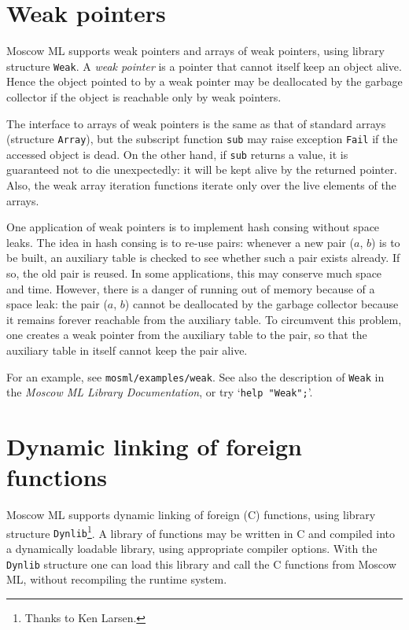 \documentclass[fleqn,a4paper]{article}
\begin{document}
\newpage


\section{Weak pointers}
\label{sec-weak-pointers}

Moscow ML supports weak pointers and arrays of weak pointers, using
library structure {\tt Weak}.  A {\em weak pointer\/} is a pointer
that cannot itself keep an object alive.  Hence the object pointed to
by a weak pointer may be deallocated by the garbage collector if the
object is reachable only by weak pointers.

The interface to arrays of weak pointers is the same as that of
standard arrays (structure {\tt Array}), but the subscript function
{\tt sub} may raise exception {\tt Fail} if the accessed object is
dead.  On the other hand, if {\tt sub} returns a value, it is
guaranteed not to die unexpectedly: it will be kept alive by the
returned pointer.  Also, the weak array iteration functions iterate
only over the live elements of the arrays.

One application of weak pointers is to implement hash consing without
space leaks.  The idea in hash consing is to re-use pairs: whenever a
new pair ($a$, $b$) is to be built, an auxiliary table is checked to
see whether such a pair exists already.  If so, the old pair is
reused.  In some applications, this may conserve much space and time.
However, there is a danger of running out of memory because of a space
leak: the pair ($a$, $b$) cannot be deallocated by the garbage
collector because it remains forever reachable from the auxiliary
table.  To circumvent this problem, one creates a weak pointer from
the auxiliary table to the pair, so that the auxiliary table in itself
cannot keep the pair alive.

For an example, see {\tt mosml/examples/weak}.  See also the
description of {\tt Weak} in the \emph{Moscow ML Library
  Documentation}, or try `{\tt help "Weak";}'.


\section{Dynamic linking of foreign functions}
\label{sec-dynamic-linking}

Moscow ML supports dynamic linking of foreign (C) functions, using
library structure {\tt Dynlib}\footnote{Thanks to Ken Larsen.}.  A
library of functions may be written in C and compiled into a
dynamically loadable library, using appropriate compiler options.
With the {\tt Dynlib} structure one can load this library and call the
C functions from Moscow ML, without recompiling the runtime system.
\end{document}
